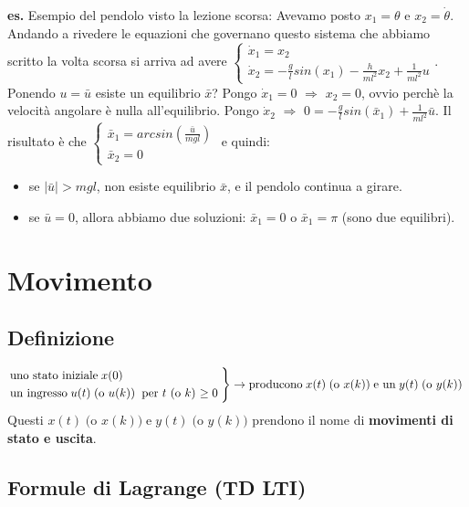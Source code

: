 \newline
\textbf{es.} Esempio del pendolo visto la lezione scorsa:\newline
Avevamo posto $x_1 = \theta$ e $x_2 = \dot{\theta}$. Andando a rivedere le equazioni che governano questo sistema che abbiamo scritto la volta scorsa si arriva ad avere $\begin{cases}
    \dot{x}_1 = x_2\\
    \dot{x}_2 = - \frac{g}{l} sin(x_1) - \frac{h}{ml^2} x_2 + \frac{1}{ml^2}u
\end{cases}$.\newline
Ponendo $u = \bar{u}$ esiste un equilibrio $\bar{x}$?\newline
Pongo $\dot{x}_1= 0$ $\Longrightarrow$ $x_2 = 0$, ovvio perchè la velocità angolare è nulla all'equilibrio.\newline
Pongo $\dot{x}_2$ $\Longrightarrow$ $0 = - \frac{g}{l}sin(\bar{x}_1) + \frac{1}{ml^2} \bar{u}$.\newline
Il risultato è che $\begin{cases}
    \bar{x}_1 = arcsin(\frac{\bar{u}}{mgl})\\
    \bar{x}_2 = 0
\end{cases}$ e quindi:
\begin{itemize}
    \item  se $|\bar{u}| > mgl$, non esiste equilibrio $\bar{x}$, e il pendolo continua a girare.
    \item  se $\bar{u} = 0$, allora abbiamo due soluzioni: $\bar{x}_1 = 0$ o $\bar{x}_1 = \pi$ (sono due equilibri).
\end{itemize}
\newpage
\section{Movimento}
\subsection{Definizione}
\[
    \begin{rcases}
        \text{uno stato iniziale}\; x(0)\\
        \text{un ingresso}\; u(t) \;\text{(o $u(k)$)} \;\;\text{per $t$ (o $k$) $\geq 0$}\;
    \end{rcases} \rightarrow \text{producono}\; x(t) \;\text{(o $x(k)$)}\; \text{e un}\;y(t) \;\text{(o $y(k)$)}\; 
\]
Questi $x(t) \;\text{(o $x(k)$)} \;\text{e}\;y(t) \;\text{(o $y(k)$)}$ prendono il nome di \textbf{movimenti di stato e uscita}.
\subsection{Formule di Lagrange (TD LTI)}
